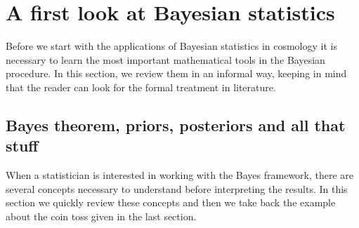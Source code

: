 \documentclass[onecolumn,           %
               showpacs,            %
               preprintnumbers,     %
               aps,                 %
               letterpaper,             %
               superscriptaddress,      %
               nofootinbib,         %
               tightenlines,        %
               floats,floatfix      %
               ,usenatbib,
               ]{revtex4-1}
\begin{document}

\section{A first look at Bayesian statistics}

Before we start with the applications of Bayesian statistics in cosmology it is necessary to learn the most important mathematical tools in the Bayesian procedure. In this section, we review them in an informal way, keeping in mind that the reader can look for the formal treatment in literature.   

\subsection{Bayes theorem, priors, posteriors and all that stuff}\label{BTPP}

When a statistician is interested in working with the Bayes framework, there are several concepts necessary to understand before interpreting the results. In this section we quickly review these concepts and then we take back the example about the coin toss given in the last section. 
\end{document}
